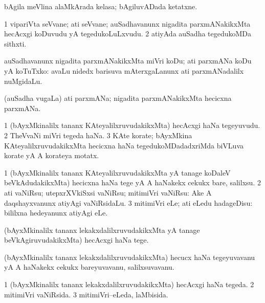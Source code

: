 \bentry
{}
\gl{\nA}
\bmng
bAgila meVlina alaMkArada kelasa; bAgiluvADada ketatxne. 
\emng
\eentry

\bentry
{}
\gl{\nA}
\bmng
\bnum
\num{1} vipariVta seVvane; ati seVvane; auSadhavanunx nigadita parxmANakikxMta hecAcxgi koDuvudu yA tegedukoLuLxvudu. 
\num{2} atiyAda auSadha tegedukoMDa sithxti. 
\enum
\emng
\eentry

\bentry
{}
\gl{\sakirx}
\bmng
auSadhavanunx nigadita parxmANakikxMta miVri koDu; ati parxmANa koDu yA koTuTxko:  avaLu nidedx barisuva mAterxgaLanunx ati parxmANadalilx nuMgidaLu. 
\emng
\eentry

\bentry
{}
\gl{\nA}
\bmng
(auSadha \mo vugaLa) ati parxmANa; nigadita parxmANakikxMta hecicxna parxmANa. 
\emng
\eentry

\bentry
{}
\gl{\nA}
\bmng
\bnum
\num{1} (bAyxMkinalilx tananx KAteyalilxruvudakikxMta) hecAcxgi haNa tegeyuvudu. 
\num{2} TheVvaNi miVri tegeda haNa. 
\num{3} KAte korate; bAyxMkina KAteyalilxruvudakikxMta hecicxna haNa tegedukoMDadadxriMda biVLuva korate yA A korateya motatx. 
\enum
\emng
\eentry

\bentry
{}
\gl{\sakirx}
\bmng
\bnum
\num{1} (bAyxMkinalilx tananx KAteyalilxruvudakikxMta yA tanage koDaleV beVkAdudakikxMta) hecicxna haNa tege yA A haNakekx cekukx bare, salilxsu. 
\num{2} ati vaNiRsu; utepxrXVkiSxsi vaNiRsu; mitimiVri vaNiRsu:  Ake A daqshayxvanunx atiyAgi vaNiRsidaLu. 
\num{3} mitimiVri eLe; ati eLedu hadageDisu:  bililxna hedeyanunx atiyAgi eLe. 
\enum
\emng

\noindent
\gl{\akirx}
\bmng
(bAyxMkinalilx tananx lekakxdalilxruvudakikxMta yA tanage beVkAgiruvudakikxMta) hecAcxgi haNa tege. 
\emng
\eentry

\bentry
{}
\gl{\nA}
\bmng
(bAyxMkinalilx tananx lekakxdalilxruvudakikxMta) hecucx haNa tegeyuvavanu yA A haNakekx cekukx bareyuvavanu, salilxsuvavanu. 
\emng
\eentry

\bentry
{}
\gl{\gu}
\bmng
\bnum
\num{1} (bAyxMkinalilx tananx lekakxdalilxruvudakikxMta) hecAcxgi haNa tegeda. 
\num{2} mitimiVri vaNiRsida. 
\num{3} mitimiVri--eLeda, laMbisida. 
\enum
\emng
\eentry

